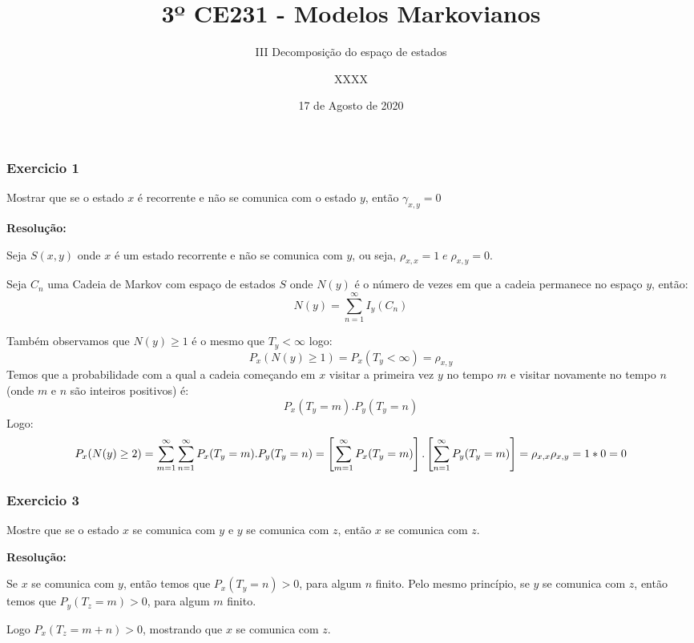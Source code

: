\documentclass[
]{article}
\title{3º CE231 - Modelos Markovianos}
\subtitle{III Decomposição do espaço de estados}
\author{XXXX}
\date{17 de Agosto de 2020}
\begin{document}
\maketitle

\hypertarget{exercicio-1}{%
\subsubsection{Exercicio 1}\label{exercicio-1}}

Mostrar que se o estado \(x\) é recorrente e não se comunica com o
estado \(y\), então \(γ_{x,y}=0\)

\textbf{Resolução:}

Seja \(S(x,y)\) onde \(x\) é um estado recorrente e não se comunica com
\(y\), ou seja, \(\rho_{x,x}=1 \;e \; \rho_{x,y}=0\).

Seja \(C_{n}\) uma Cadeia de Markov com espaço de estados \(S\) onde
\(N(y)\) é o número de vezes em que a cadeia permanece no espaço \(y\),
então: \[N(y)=\sum_{n=1}^{\infty}I_{y}(C_{n})\]

Também observamos que \(N(y)\geq 1\) é o mesmo que \(T_{y}<\infty\)
logo: \[P_{x}(N(y)\geq1)=P_{x}(T_{y}<\infty)=\rho_{x,y}\] Temos que a
probabilidade com a qual a cadeia começando em \(x\) visitar a primeira
vez \(y\) no tempo \(m\) e visitar novamente no tempo \(n\) (onde \(m\)
e \(n\) são inteiros positivos) é: \[P_{x}(T_{y}=m).P_{y}(T_{y}=n)\]
Logo:
\[P_{x}(N(y)\geq2)=\sum_{m=1}^{\infty}\sum_{n=1}^{\infty}P_{x}(T_{y}=m).P_{y}(T_{y}=n)\\
=\left [ \sum_{m=1}^{\infty}P_{x}(T_{y}=m) \right ].\left [ \sum_{n=1}^{\infty}P_{y}(T_{y}=m)\right ]=\rho_{x,x}\rho_{x,y}=1*0=0\]

\pagebreak

\hypertarget{exercicio-3}{%
\subsubsection{Exercicio 3}\label{exercicio-3}}

Mostre que se o estado \(x\) se comunica com \(y\) e \(y\) se comunica
com \(z\), então \(x\) se comunica com \(z\).

\textbf{Resolução:}

Se \(x\) se comunica com \(y\), então temos que \(P_{x}(T_{y}=n)>0\),
para algum \(n\) finito. Pelo mesmo princípio, se \(y\) se comunica com
\(z\), então temos que \(P_{y}(T_{z}=m)>0\), para algum \(m\) finito.

Logo \(P_{x}(T_{z}=m+n)>0\), mostrando que \(x\) se comunica com \(z\).
\end{document}
